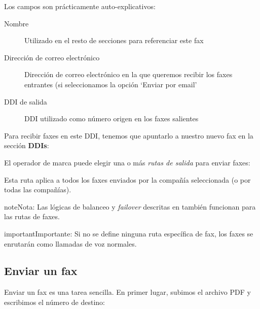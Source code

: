 \documentclass[letterpaper,10pt,spanish]{sphinxmanual}
\begin{document}
Los campos son prácticamente auto-explicativos:
\begin{description}
\item[{Nombre}] \leavevmode{}\label{faxing/index:term-name}
Utilizado en el resto de secciones para referenciar este fax

\item[{Dirección de correo electrónico}] \leavevmode{}\label{faxing/index:term-email}
Dirección de correo electrónico en la que queremos recibir los faxes entrantes (si seleccionamos la opción `Enviar por email'

\item[{DDI de salida}] \leavevmode{}\label{faxing/index:term-outbound-ddi}
DDI utilizado como número origen en los faxes salientes

\end{description}

Para recibir faxes en este DDI, tenemos que apuntarlo a nuestro nuevo fax en la sección \textbf{DDIs}:


El operador de marca puede elegir una o más \emph{rutas de salida} para enviar faxes:


Esta ruta aplica a todos los faxes enviados por la compañía seleccionada (o por todas las compañías).

\begin{notice}{note}{Nota:}
Las lógicas de balanceo y \emph{failover} descritas en {\hyperref[external_outgoing_calls/call_routing:routes\string-metrics]{}} también funcionan para las rutas de faxes.
\end{notice}

\begin{notice}{important}{Importante:}
Si no se define ninguna ruta específica de fax, los faxes se enrutarán como llamadas de voz normales.
\end{notice}


\subsection{Enviar un fax}
\label{faxing/index:sending-a-fax}
Enviar un fax es una tarea sencilla. En primer lugar, subimos el archivo PDF y escribimos el número de destino:
\end{document}
